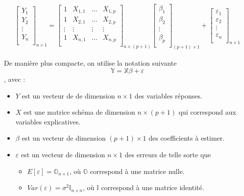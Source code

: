 \documentclass[11pt,french]{report}
\begin{document}
\begin{align*}
\begin{bmatrix} 
Y_1  \\
Y_2  \\
\vdots \\
Y_n \\
\end{bmatrix}_{n\times 1} =
\begin{bmatrix} 
1 & X_{1,1} & ... & X_{1,p} \\
1 & X_{2,1} & ... & X_{2,p}  \\
\vdots & \vdots & \vdots & \vdots \\
1 &  X_{n,1} & ... & X_{n,p} \\
\end{bmatrix}_{n\times (p + 1)} 
\begin{bmatrix} 
\beta_1 \\
\beta_2  \\
\vdots \\
\beta_p \\
\end{bmatrix}_{(p + 1) \times 1}+ 
\begin{bmatrix} 
\varepsilon_1 \\
\varepsilon_2 \\
\vdots \\
\varepsilon_n \\
\end{bmatrix}_{n\times 1} 
\end{align*}

De manière plus compacte, on utilise la notation suivante
$$
\mathbb{Y} = \mathbb{X}  \mathbb{\beta}  + \mathbb{\varepsilon}  
$$
, avec :
\begin{itemize}
\item $Y$ est un vecteur de de dimension $n \times 1$ des variables réponses.
\item $X$ est une matrice schéma de dimension $n \times (p+1)$ qui correspond aux variables explicatives.
\item $\beta$ est un vecteur de dimension $(p+1) \times 1$ des coefficients à estimer.
\item $\varepsilon$ est un vecteur de dimension $n \times 1$ des erreurs de telle sorte que
     \begin{itemize}
     \item $E[\varepsilon] = \mathbb{O}_{n\times 1}$, où $\mathbb{O}$ correspond à une matrice nulle.
     \item $Var(\varepsilon) = \sigma^2 \mathbb{I}_{n \times n}$, où $\mathbb{I}$ correspond à une matrice identité.
     \end{itemize}
\end{itemize}
\end{document}
